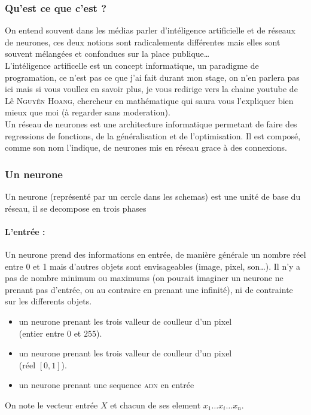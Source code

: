 
\subsubsection{Qu'est ce que c'est ?}
On entend souvent dans les médias parler d'intéligence artificielle et de réseaux de neurones,
ces deux notions sont radicalements différentes
mais elles sont souvent mélangées et confondues sur la place publique\ldots \\

L'intéligence artificelle est un concept informatique, un paradigme de programation,
ce n'est pas ce que j'ai fait durant mon stage, on n'en parlera pas ici mais si vous voullez en savoir plus,
je vous redirige vers la chaine youtube de Lê \textsc{Nguyên Hoang}, chercheur en mathématique qui saura
vous l'expliquer bien mieux que moi (à regarder sans moderation)\cite{science4all}. \\

Un réseau de neurones est une architecture informatique permetant de faire
des regressions de fonctions, de la généralisation et de l'optimisation.
Il est composé, comme son nom l'indique, de neurones mis en réseau grace à des connexions.


\subsubsection{Un neurone}
Un neurone (représenté par un cercle dans les schemas) est une unité de base du réseau,
il se decompose en trois phases

\paragraph{L'entrée :}
Un neurone prend des informations en entrée, de manière générale un nombre réel entre 0 et 1
mais d'autres objets sont envisageables (image, pixel, son\ldots).
Il n'y a pas de nombre minimum ou maximums
(on pourait imaginer un neurone ne prenant pas d'entrée, ou au contraire en prenant une infinité),
ni de contrainte sur les differents objets.
\exemle
{
\begin{itemize}
    \item un neurone prenant les trois valleur de coulleur d'un pixel\\
            (entier entre $0$ et $255$).
    \item un neurone prenant les trois valleur de coulleur d'un pixel\\
            (réel $[0, 1]$).
    \item un neurone prenant une sequence \textsc{adn} en entrée

\end{itemize}
}
On note le vecteur entrée $X$ et chacun de ses element $x_1 \ldots x_i \ldots x_n$.

